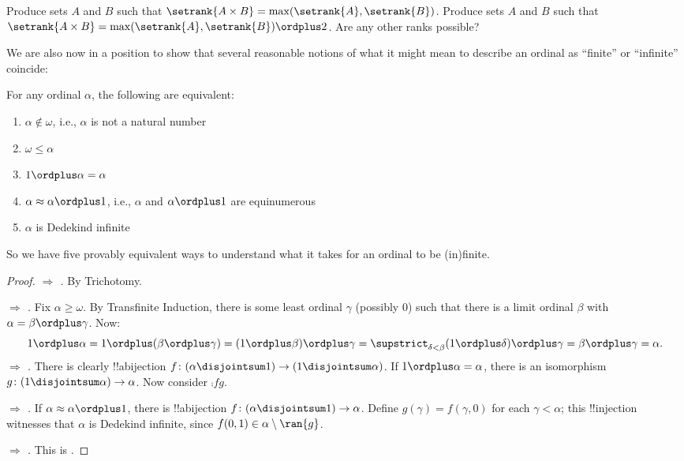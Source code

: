 \documentclass[../../../include/open-logic-section]{subfiles}
\begin{document}
\begin{prob}
Produce sets $A$ and $B$ such that $\setrank{A \times B}=
\max(\setrank{A}, \setrank{B})$. Produce sets $A$ and $B$ such that
$\setrank{A \times B} = \max(\setrank{A}, \setrank{B}) \ordplus  2$. Are
any other ranks possible?
\end{prob}

We are also now in a position to show that several reasonable notions
of what it might mean to describe an ordinal as ``finite'' or ``infinite'' coincide:

\begin{lem}
For any ordinal $\alpha$, the following are equivalent:
\begin{enumerate}
	\item{} $\alpha\notin \omega$, i.e.,
	$\alpha$ is not a natural number
	\item{} $\omega \leq \alpha$ 
	\item{} $1 \ordplus  \alpha = \alpha$ 
	\item{} $\alpha \approx \alpha\ordplus 1$,
	i.e., $\alpha$ and $\alpha\ordplus 1$ are equinumerous
	\item{} $\alpha$ is Dedekind infinite	
	\end{enumerate}
\end{lem}
\noindent
So we have five provably equivalent ways to understand what it takes for an ordinal to be (in)finite.

\begin{proof}
\emph{ $\Rightarrow$ .} By
Trichotomy. 

\emph{ $\Rightarrow$ .} Fix
$\alpha \geq \omega$. By Transfinite Induction, there is some least
ordinal $\gamma$ (possibly $0$) such that there is a limit ordinal
$\beta$ with $\alpha = \beta \ordplus \gamma$. Now:
\[
	1 \ordplus \alpha =  
	1 \ordplus (\beta \ordplus \gamma) = 
	(1 \ordplus \beta) \ordplus \gamma =  
	\supstrict_{\delta < \beta} (1 \ordplus  \delta) \ordplus  \gamma = 
	\beta \ordplus  \gamma = 
	\alpha.
\]
\emph{ $\Rightarrow$ .} There is
clearly !!a{bijection} $f \colon (\alpha \disjointsum 1) \to (1
\disjointsum \alpha)$. If $1 \ordplus \alpha = \alpha$, there is an
isomorphism $g \colon (1 \disjointsum \alpha) \to \alpha$. Now
consider $\comp{f}{g}$.

\emph{ $\Rightarrow$ .} If
$\alpha \approx \alpha \ordplus 1$, there is !!a{bijection} $f \colon
(\alpha \disjointsum 1) \to \alpha$. Define $g(\gamma) = f(\gamma, 0)$
for each $\gamma < \alpha$; this !!{injection} witnesses that $\alpha$
is Dedekind infinite, since $f(0,1) \in \alpha \setminus \ran{g}$. 

\emph{ $\Rightarrow$ .} This
is .
\end{proof}
\end{document}
